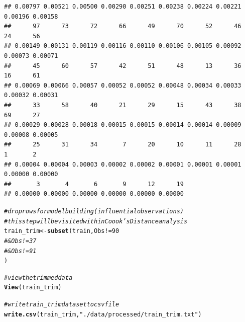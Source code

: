 \documentclass{article}\usepackage[]{graphicx}\usepackage[]{color}
\makeatletter
\newcommand{\hlnum}[1]{\textcolor[rgb]{0.686,0.059,0.569}{#1}}%
\newcommand{\hlstr}[1]{\textcolor[rgb]{0.192,0.494,0.8}{#1}}%
\newcommand{\hlcom}[1]{\textcolor[rgb]{0.678,0.584,0.686}{\textit{#1}}}%
\newcommand{\hlopt}[1]{\textcolor[rgb]{0,0,0}{#1}}%
\newcommand{\hlstd}[1]{\textcolor[rgb]{0.345,0.345,0.345}{#1}}%
\newcommand{\hlkwb}[1]{\textcolor[rgb]{0.69,0.353,0.396}{#1}}%
\newcommand{\hlkwd}[1]{\textcolor[rgb]{0.737,0.353,0.396}{\textbf{#1}}}%
\newenvironment{kframe}{%
 \def\at@end@of@kframe{}%
 \ifinner\ifhmode%
  \def\at@end@of@kframe{\end{minipage}}%
  \begin{minipage}{\columnwidth}%
 \fi\fi%
 \def\FrameCommand##1{\hskip\@totalleftmargin \hskip-\fboxsep
 \colorbox{shadecolor}{##1}\hskip-\fboxsep
     \hskip-\linewidth \hskip-\@totalleftmargin \hskip\columnwidth}%
 \MakeFramed {\advance\hsize-\width
   \@totalleftmargin\z@ \linewidth\hsize
   \@setminipage}}%
 {\par\unskip\endMakeFramed%
 \at@end@of@kframe}
\newenvironment{knitrout}{}{} %
\makeatother
\begin{document}
\begin{knitrout}
\begin{kframe}
\begin{verbatim}
## 0.00797 0.00521 0.00500 0.00290 0.00251 0.00238 0.00224 0.00221 0.00196 0.00158 
##      97      73      72      66      49      70      52      46      24      56 
## 0.00149 0.00131 0.00119 0.00116 0.00110 0.00106 0.00105 0.00092 0.00073 0.00071 
##      45      60      57      42      51      48      13      36      16      61 
## 0.00069 0.00066 0.00057 0.00052 0.00052 0.00048 0.00034 0.00033 0.00032 0.00031 
##      33      58      40      21      29      15      43      38      69      27 
## 0.00029 0.00028 0.00018 0.00015 0.00015 0.00014 0.00014 0.00009 0.00008 0.00005 
##      25      31      34       7      20      10      11      28       1       2 
## 0.00004 0.00004 0.00003 0.00002 0.00002 0.00001 0.00001 0.00001 0.00000 0.00000 
##       3       4       6       9      12      19 
## 0.00000 0.00000 0.00000 0.00000 0.00000 0.00000
\end{verbatim}
\begin{alltt}
\hlcom{# drop rows for model building (influential observations)}
\hlcom{# this step will be visited within Coook's Distance analysis}
\hlstd{train_trim} \hlkwb{<-} \hlkwd{subset}\hlstd{(train, Obs} \hlopt{!=} \hlnum{90}
                     \hlcom{#  & Obs != 37}
                     \hlcom{#  & Obs != 91}
\hlstd{)}

\hlcom{# view the trimmed data}
\hlkwd{View}\hlstd{(train_trim)}

\hlcom{# write train_trim dataset to csv file}
\hlkwd{write.csv}\hlstd{(train_trim,} \hlstr{"./data/processed/train_trim.txt"}\hlstd{)}


\end{alltt}
\end{kframe}
\end{knitrout}
\end{document}

